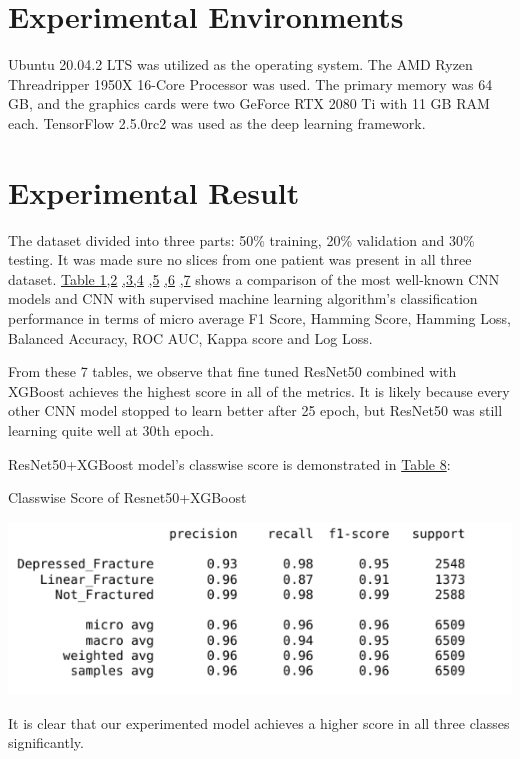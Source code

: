 \documentclass[sigconf]{acmart}
\begin{document}
\section{Experimental Environments}
Ubuntu 20.04.2 LTS was utilized as the operating system. The AMD Ryzen Threadripper 1950X 16-Core Processor was used. The primary memory was 64 GB, and the graphics cards were two GeForce RTX 2080 Ti with 11 GB RAM each. TensorFlow 2.5.0rc2 was used as the deep learning framework.
\section{Experimental Result}
The dataset divided into three parts: 50\% training, 20\% validation and 30\% testing. It was made sure no slices from one patient was present in all three dataset. \hyperref[Tab.1]{Table 1}\hyperref[Tab.2]{,2} \hyperref[Tab.3]{,3}\hyperref[Tab.13]{,4} \hyperref[Tab.5]{,5} \hyperref[Tab.6]{,6} \hyperref[Tab.7]{,7} shows a comparison of the most well-known CNN models and CNN with supervised machine learning algorithm’s classification performance in terms of micro average F1 Score, Hamming Score, Hamming Loss, Balanced Accuracy, ROC AUC, Kappa score and Log Loss.

From these 7 tables, we observe that fine tuned ResNet50 combined with XGBoost achieves the highest score in all of the metrics. It is likely because every other CNN model stopped to learn better after 25 epoch, but ResNet50 was still learning quite well at 30th epoch.

ResNet50+XGBoost model’s classwise score is demonstrated in \hyperref[Tab.8]{Table 8}:
\begin{table}[h]
  \centering
   \caption{Classwise Score of Resnet50+XGBoost}
  \includegraphics[width=\linewidth]{../supplements/XXXXX.png}
 
  \label{Tab.8}
\end{table}

It is clear that our experimented model achieves a higher score in all three classes significantly.
\end{document}
